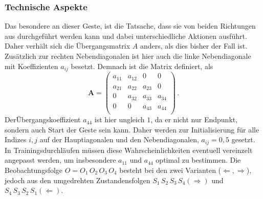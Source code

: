 \subsubsection{Technische Aspekte}
Das besondere an dieser Geste, ist die Tatsache, dass sie von beiden Richtungen aus durchgef\"uhrt werden kann und dabei unterschiedliche Aktionen ausf\"uhrt.
\newline
Daher verh\"alt sich die \"Ubergangsmatrix $A$ anders, als dies bisher der Fall ist. Zus\"atzlich zur rechten Nebendiagonalen ist hier auch die linke Nebendiagonale mit Koeffizienten $a_{ij}$ besetzt. Demnach ist die Matrix definiert, als
\begin{equation}
\mathbf{A} = 
\begin{pmatrix}
a_{11} & a_{12} & 0 & 0\\
 a_{21} & a_{22} & a_{23} & 0\\
0 &  a_{32} & a_{33} & a_{34}\\
0 & 0 & a_{43} & a_{44} \\
\end{pmatrix} \, .
\end{equation}
Der\"Ubergangskoeffizient $a_{44}$ ist hier ungleich $1$, da er nicht nur Endpunkt, sondern auch Start der Geste sein kann. Daher werden zur Initialisierung f\"ur alle Indizes $i, j$ auf der Hauptiagonalen und den Nebendiagonalen, $a_{ij} = 0,5$ gesetzt. In Trainingsdurchl\"aufen m\"ussen diese Wahrscheinlichkeiten eventuell vereinzelt angepasst werden, um insbesondere $a_{11}$ und $a_{44}$ optimal zu bestimmen. Die Beobachtungsfolge $O = O_1\, O_2\, O_3\, O_4$ besteht bei den zwei Varianten ($\Leftarrow, \Rightarrow$), jedoch aus den umgedrehten Zustandensfolgen $S_1\, S_2\, S_3\, S_4 (\Rightarrow)$ und $S_4\, S_3\, S_2\, S_1 (\Leftarrow)$.